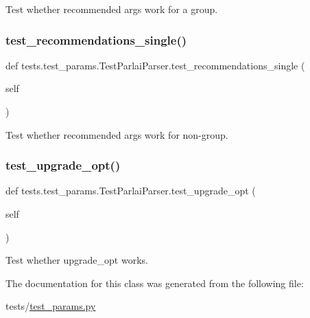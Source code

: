 \begin{DoxyVerb}Test whether recommended args work for a group.
\end{DoxyVerb}
 \mbox{\label{classtests_1_1test__params_1_1TestParlaiParser_aa34d539da2370132f7a4974008422f55}} 
\subsubsection{\texorpdfstring{test\+\_\+recommendations\+\_\+single()}{test\_recommendations\_single()}}
{\footnotesize\ttfamily def tests.\+test\+\_\+params.\+Test\+Parlai\+Parser.\+test\+\_\+recommendations\+\_\+single (\begin{DoxyParamCaption}\item[{}]{self }\end{DoxyParamCaption})}

\begin{DoxyVerb}Test whether recommended args work for non-group.
\end{DoxyVerb}
 \mbox{\label{classtests_1_1test__params_1_1TestParlaiParser_acf8ab1cdd831a5743f56623c0af87d5e}} 
\subsubsection{\texorpdfstring{test\+\_\+upgrade\+\_\+opt()}{test\_upgrade\_opt()}}
{\footnotesize\ttfamily def tests.\+test\+\_\+params.\+Test\+Parlai\+Parser.\+test\+\_\+upgrade\+\_\+opt (\begin{DoxyParamCaption}\item[{}]{self }\end{DoxyParamCaption})}

\begin{DoxyVerb}Test whether upgrade_opt works.
\end{DoxyVerb}
 

The documentation for this class was generated from the following file\+:\begin{DoxyCompactItemize}
\item 
tests/\hyperlink{test__params_8py}{test\+\_\+params.\+py}\end{DoxyCompactItemize}
